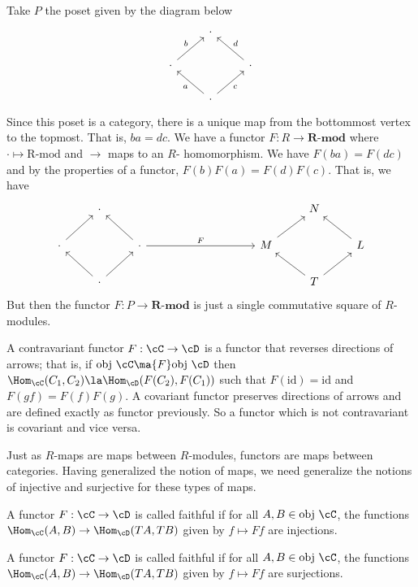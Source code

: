 \begin{ex}
Take $P$ the poset given by the diagram below
	\[
	\begin{tikzcd}
	 & \cdot & \\
	\cdot \arrow{ur}{b} & & \cdot \arrow[swap]{ul}{d} \\
	 &  \cdot \arrow{ul}{a} \arrow[swap]{ur}{c} &
	\end{tikzcd}
	\]
Since this poset is a category, there is a unique map from the bottommost vertex to the topmost. That is, $ba=dc$. We have a functor $F: R \rightarrow \textbf{R-mod}$ where $\cdot \mapsto \text{R-mod}$ and $\rightarrow$ maps to an $R$- homomorphism. We have $F(ba)=F(dc)$ and by the properties of a functor, $F(b)F(a)=F(d)F(c)$. That is, we have
	\[
	\begin{tikzcd}
	\; & \cdot & & & & & & N & \\
	\cdot \arrow{ur} & & \cdot \arrow{ul} \arrow{rrrr}{F} & & & & M \arrow{ur} & & L \arrow{ul}  \\
	  & \cdot \arrow{ul} \arrow{ur} & & & & & & T \arrow{ul} \arrow{ur}  & 
	\end{tikzcd}
	\]
But then the functor $F: P \rightarrow \textbf{R-mod}$ is just a single commutative square of $R$-modules. \xqed
\end{ex} 


\begin{dfn}
A contravariant functor $F: \cC \rightarrow \cD$ is a functor that reverses directions of arrows; that is, if $\text{obj } \cC \ma{F} \text{obj }\cD$ then $\Hom_{\cC}(C_1,C_2) \la \Hom_{\cD}(F(C_2),F(C_1))$ such that $F(\text{id})=\text{id}$ and $F(gf)=F(f)F(g)$. A covariant functor preserves directions of arrows and are defined exactly as functor previously. So a functor which is not contravariant is covariant and vice versa. 
\end{dfn}


Just as $R$-maps are maps between $R$-modules, functors are maps between categories. Having generalized the notion of maps, we need generalize the notions of injective and surjective for these types of maps.


\begin{dfn}[Faithful]
A functor $F: \cC \rightarrow \cD$ is called faithful if for all $A,B \in \text{obj }\cC$, the functions $\Hom_{\cC}(A,B) \rightarrow \Hom_{\cD}(TA,TB)$ given by $f \mapsto Ff$ are injections. 
\end{dfn}


\begin{dfn}[Full]
A functor $F: \cC \rightarrow \cD$ is called faithful if for all $A,B \in \text{obj }\cC$, the functions $\Hom_{\cC}(A,B) \rightarrow \Hom_{\cD}(TA,TB)$ given by $f \mapsto Ff$ are surjections. 
\end{dfn}



